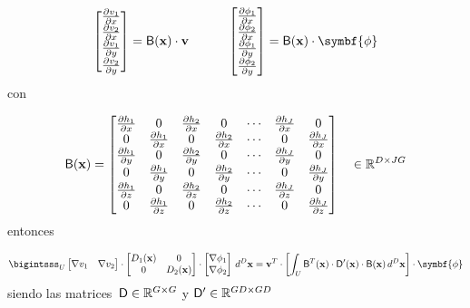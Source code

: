 \documentclass[
  12pt,
  a4paper,
  table]{scrbook}
\theoremstyle{plain}
\theoremstyle{definition}
\theoremstyle{plain}
\theoremstyle{plain}
\theoremstyle{remark}
\begin{document}
\[
\begin{bmatrix}
\frac{\partial v_1}{\partial x} \\
\frac{\partial v_2}{\partial x} \\
\frac{\partial v_1}{\partial y} \\
\frac{\partial v_2}{\partial y}
\end{bmatrix}
=
\mat{B}(\vec{x}) \cdot \vec{v}
\quad\quad\quad
\begin{bmatrix}
\frac{\partial \phi_1}{\partial x} \\
\frac{\partial \phi_2}{\partial x} \\
\frac{\partial \phi_1}{\partial y} \\
\frac{\partial \phi_2}{\partial y}
\end{bmatrix}
=
\mat{B}(\vec{x}) \cdot \symbf{\phi}
\] con

\[
\mathsf{B}(\mathbf{x}) =
\begin{bmatrix}
\frac{\partial h_1}{\partial x}   & 0 & \frac{\partial h_2}{\partial x}   & 0  & \cdots & \frac{\partial h_J}{\partial x} & 0 \\
0 & \frac{\partial h_1}{\partial x}  & 0 & \frac{\partial h_2}{\partial x} &  \cdots & 0 & \frac{\partial h_J}{\partial x}  \\
\frac{\partial h_1}{\partial y}  & 0 & \frac{\partial h_2}{\partial y}  & 0 & \cdots & \frac{\partial h_J}{\partial y} & 0 \\
0 & \frac{\partial h_1}{\partial y}  & 0 & \frac{\partial h_2}{\partial y}  & \cdots & 0 & \frac{\partial h_J}{\partial y} \\
\frac{\partial h_1}{\partial z} & 0 & \frac{\partial h_2}{\partial z} & 0 & \cdots & \frac{\partial h_J}{\partial z} & 0 \\
0 & \frac{\partial h_1}{\partial z} & 0 & \frac{\partial h_2}{\partial z}  & \cdots & 0 & \frac{\partial h_J}{\partial z} \\
\end{bmatrix} \quad \in \mathbb{R}^{D \times JG}
\] entonces

\[
\bigintsss_U
\begin{bmatrix}
 \nabla v_1 & \nabla v_2
\end{bmatrix}
\cdot
\begin{bmatrix}
D_1(\vec{x}) & 0 \\
0 & D_2(\vec{x}) \\
\end{bmatrix}
\cdot
\begin{bmatrix}
\nabla \phi_1  \\
\nabla \phi_2  \\
\end{bmatrix}
\, d^D\vec{x}
=
\vec{v}^T
\cdot
\left[
\int_U
\mat{B}^T(\vec{x})
\cdot
\mat{D}^{\prime}(\vec{x})
\cdot
\mat{B}(\vec{x})
\, d^D\vec{x}
\right]
\cdot
\symbf{\phi}
\] siendo las matrices~\(\mathsf{D} \in \mathbb{R}^{G \times G}\) y
\(\mathsf{D}^{\prime} \in \mathbb{R}^{GD \times GD}\)
\end{document}
